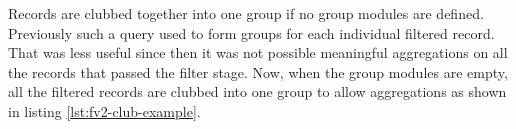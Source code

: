 Records are clubbed together into one group if no group modules are
defined. Previously such a query used to form groups for each individual
filtered record.  That
was less useful since then it was not possible meaningful aggregations
on all the records that passed the filter stage. Now, when the group
modules are empty, all the filtered records are clubbed into one group
to allow aggregations as shown in listing \ref{lst:fv2-club-example}.
